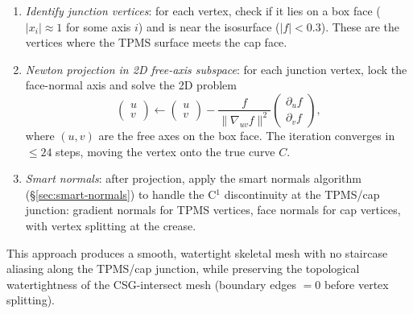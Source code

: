 \documentclass[11pt]{article}
\begin{document}
\begin{enumerate}[leftmargin=2em]
  \item \emph{Identify junction vertices}: for each vertex, check if
        it lies on a box face ($|x_i| \approx 1$ for some axis $i$)
        and is near the isosurface ($|f| < 0.3$).  These are the
        vertices where the TPMS surface meets the cap face.
  \item \emph{Newton projection in 2D free-axis subspace}: for each
        junction vertex, lock the face-normal axis and solve the 2D
        problem
        \begin{equation}
          \begin{pmatrix} u \\ v \end{pmatrix}
          \leftarrow
          \begin{pmatrix} u \\ v \end{pmatrix}
          - \frac{f}{\|\nabla_{\!uv} f\|^2}
          \begin{pmatrix} \partial_u f \\ \partial_v f \end{pmatrix},
        \end{equation}
        where $(u, v)$ are the free axes on the box face.  The
        iteration converges in $\le 24$ steps, moving the vertex onto
        the true curve $C$.
  \item \emph{Smart normals}: after projection, apply the smart
        normals algorithm (\S\ref{sec:smart-normals}) to handle the
        C$^1$ discontinuity at the TPMS/cap junction: gradient normals
        for TPMS vertices, face normals for cap vertices, with vertex
        splitting at the crease.
\end{enumerate}

This approach produces a smooth, watertight skeletal mesh with no
staircase aliasing along the TPMS/cap junction, while preserving the
topological watertightness of the CSG-intersect mesh (boundary edges
$= 0$ before vertex splitting).
\end{document}
